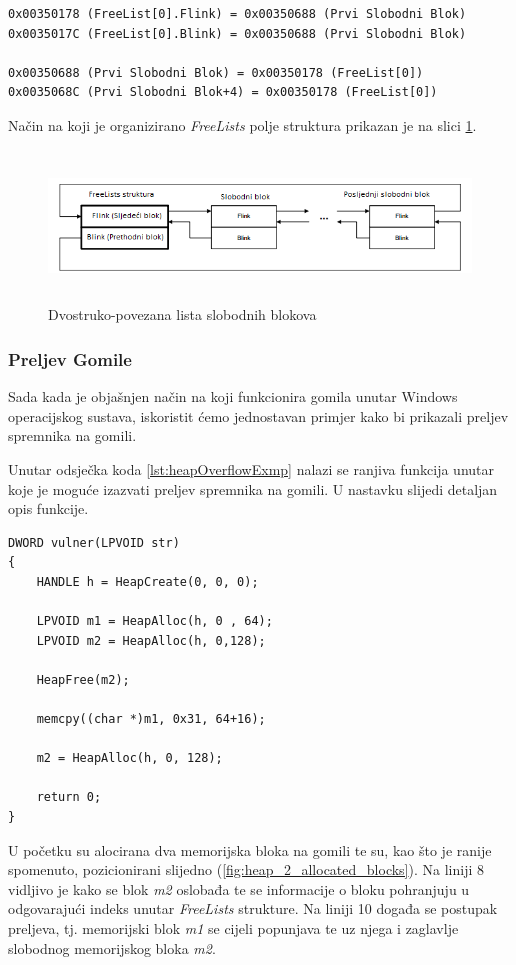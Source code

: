 \documentclass[times, utf8, diplomski, numeric]{fer}
\begin{document}
\begin{lstlisting}[frame=single, caption=Prvi slobodni blok gomile, label={lst:freeLists0}]
0x00350178 (FreeList[0].Flink) = 0x00350688 (Prvi Slobodni Blok)
0x0035017C (FreeList[0].Blink) = 0x00350688 (Prvi Slobodni Blok)

0x00350688 (Prvi Slobodni Blok) = 0x00350178 (FreeList[0])
0x0035068C (Prvi Slobodni Blok+4) = 0x00350178 (FreeList[0])
\end{lstlisting}
Način na koji je organizirano \emph{FreeLists} polje struktura prikazan je na slici \ref{fig:free_lists_entries}.

\begin{figure}[!ht]
\centering
\setlength\fboxsep{0pt}
\setlength\fboxrule{0.5pt}
\includegraphics[width=15cm, height=4cm]{slike/free_lists_entries}
\caption{Dvostruko-povezana lista slobodnih blokova}
\label{fig:free_lists_entries} 
\end{figure}

\subsubsection{Preljev Gomile}
Sada kada je objašnjen način na koji funkcionira gomila unutar Windows operacijskog sustava, iskoristit ćemo jednostavan primjer kako bi prikazali preljev spremnika na gomili.

Unutar odsječka koda \ref{lst:heapOverflowExmp} nalazi se ranjiva funkcija unutar koje je moguće izazvati preljev spremnika na gomili. U nastavku slijedi detaljan opis funkcije.

\begin{lstlisting}[frame=single, caption=Primjer preljeva gomile, label={lst:heapOverflowExmp}]
DWORD vulner(LPVOID str)
{
    HANDLE h = HeapCreate(0, 0, 0);
 
    LPVOID m1 = HeapAlloc(h, 0 , 64);
    LPVOID m2 = HeapAlloc(h, 0,128);
 
    HeapFree(m2);

    memcpy((char *)m1, 0x31, 64+16);
 
    m2 = HeapAlloc(h, 0, 128);
 
    return 0;
}
\end{lstlisting}
U početku su alocirana dva memorijska bloka na gomili te su, kao što je ranije spomenuto, pozicionirani slijedno (\ref{fig:heap_2_allocated_blocks}). Na liniji 8 vidljivo je kako se blok \emph{m2} oslobađa te se informacije o bloku pohranjuju u odgovarajući indeks unutar \emph{FreeLists} strukture.	Na liniji 10 događa se postupak preljeva, tj. memorijski blok \emph{m1} se cijeli popunjava te uz njega i zaglavlje slobodnog memorijskog bloka \emph{m2}.
\end{document}
